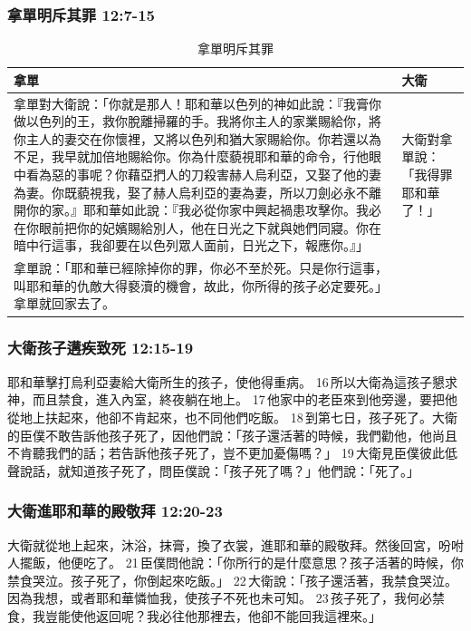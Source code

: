 \subsubsection{拿單明斥其罪 12:7-15}
\begin{table}[H]
\hspace*{-13mm}
\centering 
\begin{tabular}{p{17.5cm}|p{1.25cm}}\hline\hline
拿單&大衛\\\hline
拿單對大衛說：「你就是那人！耶和華以色列的神如此說：『我膏你做以色列的王，救你脫離掃羅的手。我將你主人的家業賜給你，將你主人的妻交在你懷裡，又將以色列和猶大家賜給你。你若還以為不足，我早就加倍地賜給你。你為什麼藐視耶和華的命令，行他眼中看為惡的事呢？你藉亞捫人的刀殺害赫人烏利亞，又娶了他的妻為妻。你既藐視我，娶了赫人烏利亞的妻為妻，所以刀劍必永不離開你的家。』耶和華如此說：『我必從你家中興起禍患攻擊你。我必在你眼前把你的妃嬪賜給別人，他在日光之下就與她們同寢。你在暗中行這事，我卻要在以色列眾人面前，日光之下，報應你。』」&大衛對拿單說：「我得罪耶和華了！」\\\hline
拿單說：「耶和華已經除掉你的罪，你必不至於死。只是你行這事，叫耶和華的仇敵大得褻瀆的機會，故此，你所得的孩子必定要死。」拿單就回家去了。&\\\hline
\end{tabular}
\caption{拿單明斥其罪}
\end{table}

\subsubsection{大衛孩子遘疾致死 12:15-19}
耶和華擊打烏利亞妻給大衛所生的孩子，使他得重病。 16 所以大衛為這孩子懇求神，而且禁食，進入內室，終夜躺在地上。 17 他家中的老臣來到他旁邊，要把他從地上扶起來，他卻不肯起來，也不同他們吃飯。 18 到第七日，孩子死了。大衛的臣僕不敢告訴他孩子死了，因他們說：「孩子還活著的時候，我們勸他，他尚且不肯聽我們的話；若告訴他孩子死了，豈不更加憂傷嗎？」 19 大衛見臣僕彼此低聲說話，就知道孩子死了，問臣僕說：「孩子死了嗎？」他們說：「死了。」 

\subsubsection{大衛進耶和華的殿敬拜 12:20-23}
大衛就從地上起來，沐浴，抹膏，換了衣裳，進耶和華的殿敬拜。然後回宮，吩咐人擺飯，他便吃了。 21 臣僕問他說：「你所行的是什麼意思？孩子活著的時候，你禁食哭泣。孩子死了，你倒起來吃飯。」 22 大衛說：「孩子還活著，我禁食哭泣。因為我想，或者耶和華憐恤我，使孩子不死也未可知。 23 孩子死了，我何必禁食，我豈能使他返回呢？我必往他那裡去，他卻不能回我這裡來。」

